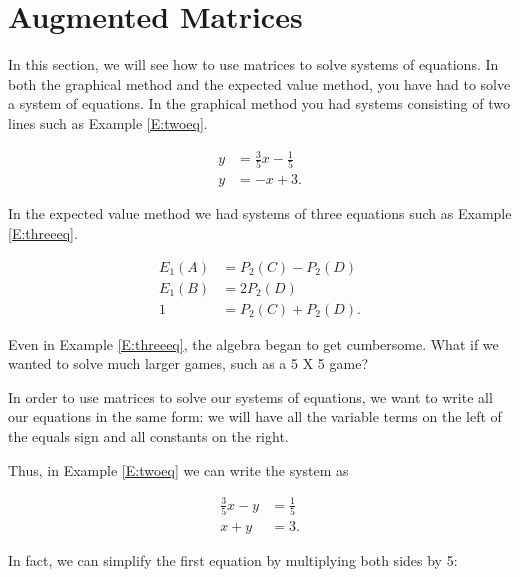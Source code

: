
\section{Augmented Matrices}




In this section, we will see how to use matrices to solve systems of equations. In both the graphical method and the expected value method, you have had to solve a system of equations. In the graphical method you had systems consisting of two lines such as Example \ref{E:twoeq}.

\begin{example}\label{E:twoeq}
\begin{align*}
y &= \frac{3}{5}x-\frac{1}{5}\\
y &=-x+3.
\end{align*}
\end{example}

In the expected value method we had systems of three equations such as Example \ref{E:threeeq}.

\begin{example}\label{E:threeeq}
\begin{align*}
E_1(A) &= P_2(C)-P_2(D)\\
E_1(B) &= 2P_2(D)\\
1 &= P_2(C)+P_2(D).
\end{align*}
\end{example}

Even in Example \ref{E:threeeq}, the algebra began to get cumbersome. What if we wanted to solve much larger games, such as a 5 X 5 game?

In order to use matrices to solve our systems of equations, we want to write all our equations in the same form: we will have all the variable terms on the left of the equals sign and all constants on the right.

Thus, in Example \ref{E:twoeq} we can write the system as

\begin{align*}
\frac{3}{5}x-y &=\frac{1}{5}\\
x+y &= 3.
\end{align*}

In fact, we can simplify the first equation by multiplying both sides by 5:

